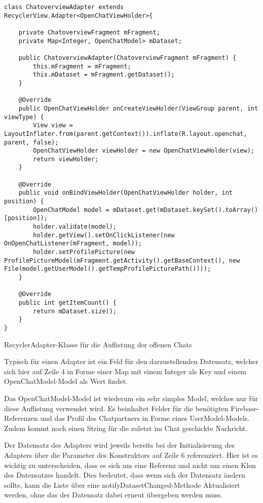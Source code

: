 \documentclass[../main.tex]{subfiles}
\begin{document}
\begin{code}
	\begin{center}
		\begin{verbatim}
class ChatoverviewAdapter extends RecyclerView.Adapter<OpenChatViewHolder>{

	private ChatoverviewFragment mFragment;
	private Map<Integer, OpenChatModel> mDataset;

	public ChatoverviewAdapter(ChatoverviewFragment mFragment) {
		this.mFragment = mFragment;
		this.mDataset = mFragment.getDataset();
	}

	@Override
	public OpenChatViewHolder onCreateViewHolder(ViewGroup parent, int viewType) {
		View view = LayoutInflater.from(parent.getContext()).inflate(R.layout.openchat, parent, false);
		OpenChatViewHolder viewHolder = new OpenChatViewHolder(view);
		return viewHolder;
	}

	@Override
	public void onBindViewHolder(OpenChatViewHolder holder, int position) {
		OpenChatModel model = mDataset.get(mDataset.keySet().toArray()[position]);
		holder.validate(model);
		holder.getView().setOnClickListener(new OnOpenChatListener(mFragment, model));
		holder.setProfilePicture(new ProfilePictureModel(mFragment.getActivity().getBaseContext(), new File(model.getUserModel().getTempProfilePicturePath())));
	}

	@Override
	public int getItemCount() {
		return mDataset.size();
	}
}
		\end{verbatim}
		\caption{RecyclerAdapter-Klasse für die Auflistung der offenen Chats}
		\label{chatOverviewAdapter}
	\end{center}
\end{code}

	Typisch für einen Adapter ist ein Feld für den darzustellenden Datensatz, welcher sich hier auf Zeile 4 in Forme einer Map mit einem Integer als Key und einem OpenChatModel-Model als Wert findet. 
	
	Das OpenChatModel-Model ist wiederum ein sehr simples Model, welches nur für diese Auflistung verwendet wird. Es beinhaltet Felder für die benötigten Firebase-Referenzen und das Profil des Chatpartners in Forme eines UserModel-Models. Zudem kommt noch einen String für die zuletzt im Chat geschickte Nachricht.
	
	Der Datensatz des Adapters wird jeweils bereits bei der Initialisierung des Adapters über die Parameter des Konstruktors auf Zeile 6 referenziert. Hier ist es wichtig zu unterscheiden, dass es sich um eine Referenz und nicht um einen Klon des Datensatzes handelt. Dies bedeutet, dass wenn sich der Datensatz ändern sollte, kann die Liste über eine notifyDatasetChanged-Methode Aktualisiert werden, ohne das der Datensatz dabei erneut übergeben werden muss.
	
\end{document}
